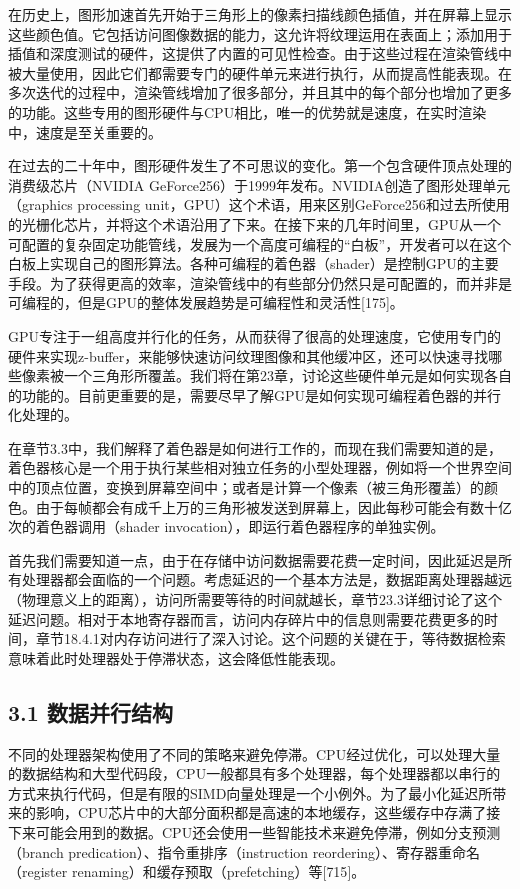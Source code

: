 \documentclass[
  paper=a4,
  ,captions=tableheading
]{scrartcl}
\begin{document}
在历史上，图形加速首先开始于三角形上的像素扫描线颜色插值，并在屏幕上显示这些颜色值。它包括访问图像数据的能力，这允许将纹理运用在表面上；添加用于插值和深度测试的硬件，这提供了内置的可见性检查。由于这些过程在渲染管线中被大量使用，因此它们都需要专门的硬件单元来进行执行，从而提高性能表现。在多次迭代的过程中，渲染管线增加了很多部分，并且其中的每个部分也增加了更多的功能。这些专用的图形硬件与CPU相比，唯一的优势就是速度，在实时渲染中，速度是至关重要的。

在过去的二十年中，图形硬件发生了不可思议的变化。第一个包含硬件顶点处理的消费级芯片（NVIDIA
GeForce256）于1999年发布。NVIDIA创造了图形处理单元（graphics processing
unit，GPU）这个术语，用来区别GeForce256和过去所使用的光栅化芯片，并将这个术语沿用了下来。在接下来的几年时间里，GPU从一个可配置的复杂固定功能管线，发展为一个高度可编程的``白板''，开发者可以在这个白板上实现自己的图形算法。各种可编程的着色器（shader）是控制GPU的主要手段。为了获得更高的效率，渲染管线中的有些部分仍然只是可配置的，而并非是可编程的，但是GPU的整体发展趋势是可编程性和灵活性{[}175{]}。

GPU专注于一组高度并行化的任务，从而获得了很高的处理速度，它使用专门的硬件来实现z-buffer，来能够快速访问纹理图像和其他缓冲区，还可以快速寻找哪些像素被一个三角形所覆盖。我们将在第23章，讨论这些硬件单元是如何实现各自的功能的。目前更重要的是，需要尽早了解GPU是如何实现可编程着色器的并行化处理的。

在章节3.3中，我们解释了着色器是如何进行工作的，而现在我们需要知道的是，着色器核心是一个用于执行某些相对独立任务的小型处理器，例如将一个世界空间中的顶点位置，变换到屏幕空间中；或者是计算一个像素（被三角形覆盖）的颜色。由于每帧都会有成千上万的三角形被发送到屏幕上，因此每秒可能会有数十亿次的着色器调用（shader
invocation），即运行着色器程序的单独实例。

首先我们需要知道一点，由于在存储中访问数据需要花费一定时间，因此延迟是所有处理器都会面临的一个问题。考虑延迟的一个基本方法是，数据距离处理器越远（物理意义上的距离），访问所需要等待的时间就越长，章节23.3详细讨论了这个延迟问题。相对于本地寄存器而言，访问内存碎片中的信息则需要花费更多的时间，章节18.4.1对内存访问进行了深入讨论。这个问题的关键在于，等待数据检索意味着此时处理器处于停滞状态，这会降低性能表现。

\subsection{3.1
数据并行结构}\label{ux6570ux636eux5e76ux884cux7ed3ux6784}

不同的处理器架构使用了不同的策略来避免停滞。CPU经过优化，可以处理大量的数据结构和大型代码段，CPU一般都具有多个处理器，每个处理器都以串行的方式来执行代码，但是有限的SIMD向量处理是一个小例外。为了最小化延迟所带来的影响，CPU芯片中的大部分面积都是高速的本地缓存，这些缓存中存满了接下来可能会用到的数据。CPU还会使用一些智能技术来避免停滞，例如分支预测（branch
predication）、指令重排序（instruction
reordering）、寄存器重命名（register
renaming）和缓存预取（prefetching）等{[}715{]}。
\end{document}
